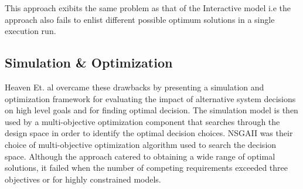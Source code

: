 This approach exibits the same problem as that of the Interactive model i.e the approach also fails to enlist different possible optimum solutions in a single execution run.


\subsection{Simulation \& Optimization}
\label{subsec:bg:lr:simOpt}

Heaven Et. al \cite{heaven11} overcame these drawbacks by presenting a simulation and optimization framework for evaluating the impact of alternative system decisions on high level goals and for finding optimal decision. The simulation model is then used by a multi-objective optimization component that searches through the design space in order to identify the optimal decision choices. NSGAII\cite{deb02} was their choice of multi-objective optimization algorithm used to search the decision space. Although the approach catered to obtaining a wide range of optimal solutions, it failed when the number of competing requirements exceeded three objectives or for highly constrained models.



